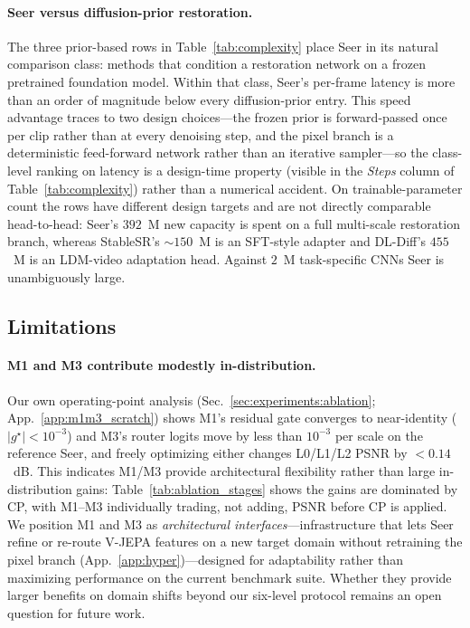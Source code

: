 \paragraph{Seer versus diffusion-prior restoration.} The three prior-based rows in Table~\ref{tab:complexity} place Seer in its natural comparison class: methods that condition a restoration network on a frozen pretrained foundation model. Within that class, Seer's per-frame latency is more than an order of magnitude below every diffusion-prior entry. This speed advantage traces to two design choices---the frozen prior is forward-passed once per clip rather than at every denoising step, and the pixel branch is a deterministic feed-forward network rather than an iterative sampler---so the class-level ranking on latency is a design-time property (visible in the \emph{Steps} column of Table~\ref{tab:complexity}) rather than a numerical accident. On trainable-parameter count the rows have different design targets and are not directly comparable head-to-head: Seer's $392$~M new capacity is spent on a full multi-scale restoration branch, whereas StableSR's $\sim\!150$~M is an SFT-style adapter and DL-Diff's $455$~M is an LDM-video adaptation head. Against $2$~M task-specific CNNs Seer is unambiguously large.


\subsection{Limitations}\label{app:limitations}

\paragraph{M1 and M3 contribute modestly in-distribution.} Our own operating-point analysis (Sec.~\ref{sec:experiments:ablation}; App.~\ref{app:m1m3_scratch}) shows M1's residual gate converges to near-identity ($|g^{\star}|\!<\!10^{-3}$) and M3's router logits move by less than $10^{-3}$ per scale on the reference Seer, and freely optimizing either changes L0/L1/L2 PSNR by ${<}0.14$~dB. This indicates M1/M3 provide architectural flexibility rather than large in-distribution gains: Table~\ref{tab:ablation_stages} shows the gains are dominated by CP, with M1--M3 individually trading, not adding, PSNR before CP is applied. We position M1 and M3 as \emph{architectural interfaces}---infrastructure that lets Seer refine or re-route V-JEPA features on a new target domain without retraining the pixel branch (App.~\ref{app:hyper})---designed for adaptability rather than maximizing performance on the current benchmark suite. Whether they provide larger benefits on domain shifts beyond our six-level protocol remains an open question for future work.

